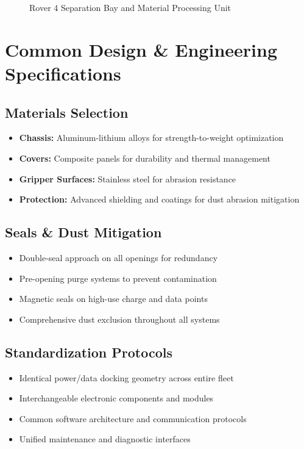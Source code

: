 \documentclass[12pt, a4paper]{article}
\begin{document}
\begin{figure}[H]
\begin{minipage}{0.45\textwidth}
        \caption{Rover 4 Separation Bay and Material Processing Unit}
        \label{fig:rover4_design}
    \end{minipage}
\end{figure}

\section{Common Design \& Engineering Specifications}

\subsection{Materials Selection}
\begin{itemize}
    \item \textbf{Chassis:} Aluminum-lithium alloys for strength-to-weight optimization
    \item \textbf{Covers:} Composite panels for durability and thermal management
    \item \textbf{Gripper Surfaces:} Stainless steel for abrasion resistance
    \item \textbf{Protection:} Advanced shielding and coatings for dust abrasion mitigation
\end{itemize}

\subsection{Seals \& Dust Mitigation}
\begin{itemize}
    \item Double-seal approach on all openings for redundancy
    \item Pre-opening purge systems to prevent contamination
    \item Magnetic seals on high-use charge and data points
    \item Comprehensive dust exclusion throughout all systems
\end{itemize}

\subsection{Standardization Protocols}
\begin{itemize}
    \item Identical power/data docking geometry across entire fleet
    \item Interchangeable electronic components and modules
    \item Common software architecture and communication protocols
    \item Unified maintenance and diagnostic interfaces
\end{itemize}
\end{document}
